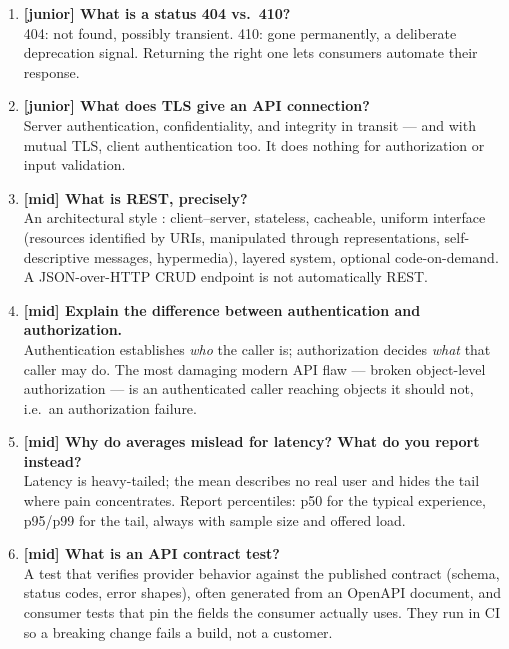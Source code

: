 \begin{enumerate}[label=\textbf{Q\arabic*.}, leftmargin=3.2em]
    One where performing it $n$ times has the same server-side effect as
    performing it once. GET, PUT, and DELETE are specified idempotent;
    POST is not, which is exactly why idempotency keys exist
    (Chapter~\ref{ch:idempotency}).
  \item \textbf{[junior] What is a status 404 vs.\ 410?}\\
    404: not found, possibly transient. 410: gone permanently, a deliberate
    deprecation signal. Returning the right one lets consumers automate
    their response.
  \item \textbf{[junior] What does TLS give an API connection?}\\
    Server authentication, confidentiality, and integrity in transit ---
    and with mutual TLS, client authentication too. It does nothing for
    authorization or input validation.
  \item \textbf{[mid] What is REST, precisely?}\\
    An architectural style \cite{fielding2000rest}: client--server,
    stateless, cacheable, uniform interface (resources identified by URIs,
    manipulated through representations, self-descriptive messages,
    hypermedia), layered system, optional code-on-demand. A JSON-over-HTTP
    CRUD endpoint is not automatically REST.
  \item \textbf{[mid] Explain the difference between authentication and
    authorization.}\\
    Authentication establishes \emph{who} the caller is; authorization
    decides \emph{what} that caller may do. The most damaging modern API
    flaw --- broken object-level authorization --- is an authenticated
    caller reaching objects it should not, i.e.\ an authorization failure.
  \item \textbf{[mid] Why do averages mislead for latency? What do you
    report instead?}\\
    Latency is heavy-tailed; the mean describes no real user and hides the
    tail where pain concentrates. Report percentiles: p50 for the typical
    experience, p95/p99 for the tail, always with sample size and offered
    load.
  \item \textbf{[mid] What is an API contract test?}\\
    A test that verifies provider behavior against the published contract
    (schema, status codes, error shapes), often generated from an OpenAPI
    document, and consumer tests that pin the fields the consumer actually
    uses. They run in CI so a breaking change fails a build, not a customer.

\end{enumerate}
